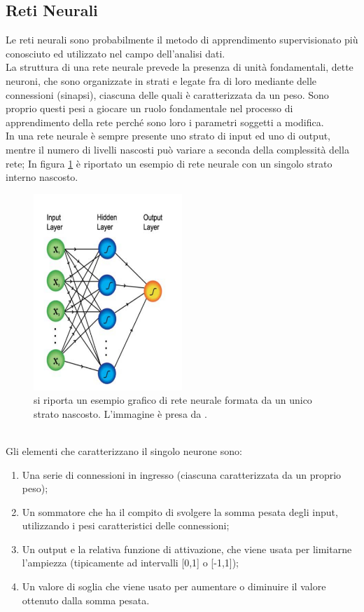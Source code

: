 \subsection{Reti Neurali}
\label{reti neurali}
Le reti neurali sono probabilmente il metodo di apprendimento supervisionato più conosciuto ed utilizzato nel campo dell'analisi dati. \\
La struttura di una rete neurale prevede la presenza di unità fondamentali, dette neuroni, che sono organizzate in strati e legate fra di loro mediante delle connessioni (sinapsi), ciascuna delle quali è caratterizzata da un peso. Sono proprio questi pesi a giocare un ruolo fondamentale nel processo di apprendimento della rete perché sono loro i parametri soggetti a modifica.\\
In una rete neurale è sempre presente uno strato di input ed uno di output, mentre il numero di livelli nascosti può variare a seconda della complessità della rete; In figura \ref{fig:schemaNN} è riportato un esempio di rete neurale con un singolo strato interno nascosto.
\begin{figure}[h!]
	\centering
	\includegraphics[width=0.50\textwidth]{figs/schemaNN.png}
	\caption{si riporta un esempio grafico di rete neurale formata da un unico strato nascosto. L'immagine è presa da \cite{Metodi_multivariati}.}
	\label{fig:schemaNN}
\end{figure}
\\
Gli elementi che caratterizzano il singolo neurone sono:
\begin{enumerate}
	\item Una serie di connessioni in ingresso (ciascuna caratterizzata da un proprio peso);
	\item Un sommatore che ha il compito di svolgere la somma pesata degli input, utilizzando i pesi caratteristici delle connessioni;
	\item Un output e la relativa funzione di attivazione, che viene usata per limitarne l'ampiezza (tipicamente ad intervalli [0,1] o [-1,1]);
	\item Un valore di soglia che viene usato per aumentare o diminuire il valore ottenuto dalla somma pesata.
\end{enumerate}
